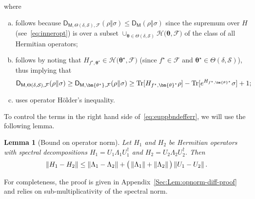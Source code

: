 \documentclass[a4paper,onecolumn,11pt,accepted=2026-05-12]{quantumarticle}
\newtheorem{lemma}[theorem]{Lemma}
\newcommand{\norm}[1]{\left\Vert#1\right\Vert}
\newcommand{\sD}{\mathsf{D}}
\newcommand{\cF}{\mathcal{F}}
\newcommand{\cH}{\mathcal{H}}
\newcommand{\cS}{\mathcal{S}}
\begin{document}
where 
\begin{enumerate}[(a)]
    \item   follows because $ \sD_{\mathsf{M},\Theta(\delta,\cS),\cF}(\rho\Vert\sigma) \leq \sD_{\mathsf{M}}(\rho\Vert\sigma)$ since the supremum  over $H$ (see~\eqref{eq:inneropt}) is over a subset $\cup_{\bm{\theta} \in \Theta(\delta,\cS)} \cH \big(\bm{\theta},\cF\big)$ of the class of all Hermitian operators;
    \item follows by noting  that  $H_{f^{\star},\bm{\theta}^{\star}} \in \cH \big(\bm{\theta}^{\star},\cF\big)$ (since $f^{\star} \in \cF$ and   $\bm{\theta}^{\star} \in \Theta(\delta,\cS)$), thus implying that
    \begin{align}
        \sD_{\mathsf{M},\Theta(\delta,\cS),\cF}(\rho\Vert\sigma) \geq   \sD_{\mathsf{M},\bm{\theta^{\star}},\cF}(\rho\Vert\sigma) \geq \operatorname{Tr}[H_{f^{\star},\bm{\theta}^{\star}}\rho
]-\operatorname{Tr}[e^{H_{f^{\star},\bm{\theta}^{\star}}}\sigma]+1; \notag
    \end{align}
    \item uses operator H\"{o}lder's inequality.
\end{enumerate}
To control the terms in the right hand side of~\eqref{eq:euppbndefferr}, we will use the following lemma.
\begin{lemma}[Bound on operator norm]\label{Lem:opnorm-diff}
Let $H_1$ and $H_2$ be Hermitian operators with spectral decompositions $H_1=U_1 \Lambda_1 U_1^{\dag}$ and $H_2=U_2 \Lambda_2 U_2^{\dag}$. Then
\begin{align}
    \norm{H_1-H_2} \leq \norm{\Lambda_1-\Lambda_2}+\big(\norm{\Lambda_1}+\norm{\Lambda_2}\big)\norm{U_1-U_2}. \notag
\end{align}
\end{lemma}
\noindent For completeness, the proof is given in Appendix~\ref{Sec:Lem:opnorm-diff-proof} and relies on sub-multiplicativity of the spectral norm.
\end{document}
